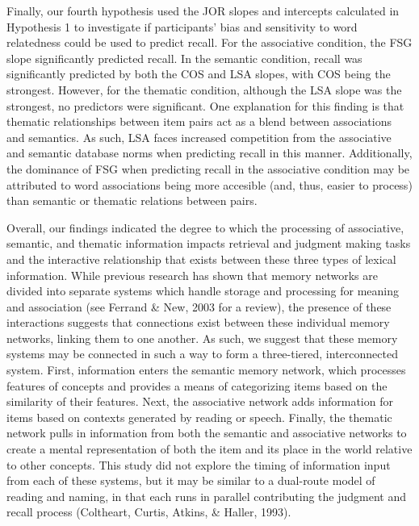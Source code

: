 \documentclass[english,man]{apa6}
\theoremstyle{definition}
\theoremstyle{definition}
\theoremstyle{definition}
\theoremstyle{remark}
\begin{document}
Finally, our fourth hypothesis used the JOR slopes and intercepts
calculated in Hypothesis 1 to investigate if participants' bias and
sensitivity to word relatedness could be used to predict recall. For the
associative condition, the FSG slope significantly predicted recall. In
the semantic condition, recall was significantly predicted by both the
COS and LSA slopes, with COS being the strongest. However, for the
thematic condition, although the LSA slope was the strongest, no
predictors were significant. One explanation for this finding is that
thematic relationships between item pairs act as a blend between
associations and semantics. As such, LSA faces increased competition
from the associative and semantic database norms when predicting recall
in this manner. Additionally, the dominance of FSG when predicting
recall in the associative condition may be attributed to word
associations being more accesible (and, thus, easier to process) than
semantic or thematic relations between pairs.

Overall, our findings indicated the degree to which the processing of
associative, semantic, and thematic information impacts retrieval and
judgment making tasks and the interactive relationship that exists
between these three types of lexical information. While previous
research has shown that memory networks are divided into separate
systems which handle storage and processing for meaning and association
(see Ferrand \& New, 2003 for a review), the presence of these
interactions suggests that connections exist between these individual
memory networks, linking them to one another. As such, we suggest that
these memory systems may be connected in such a way to form a
three-tiered, interconnected system. First, information enters the
semantic memory network, which processes features of concepts and
provides a means of categorizing items based on the similarity of their
features. Next, the associative network adds information for items based
on contexts generated by reading or speech. Finally, the thematic
network pulls in information from both the semantic and associative
networks to create a mental representation of both the item and its
place in the world relative to other concepts. This study did not
explore the timing of information input from each of these systems, but
it may be similar to a dual-route model of reading and naming, in that
each runs in parallel contributing the judgment and recall process
(Coltheart, Curtis, Atkins, \& Haller, 1993).
\end{document}
